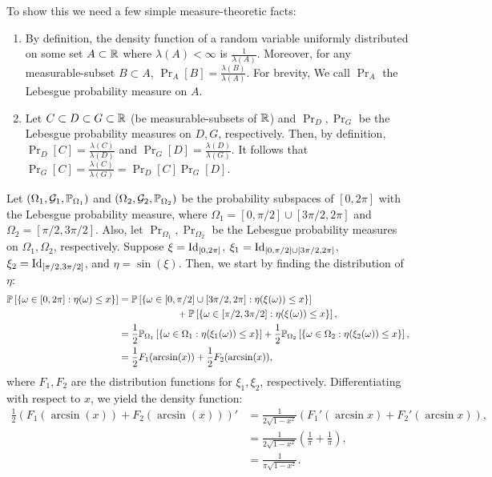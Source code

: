 \begin{problem}{11}
\end{problem}
\begin{solution}
    To show this we need a few simple measure-theoretic facts:
    \begin{enumerate}
        \item By definition, the density function of a random variable uniformly
        distributed on some set $A\subset \mathbb{R}$ where $\lambda(A) < \infty$ is
        $\frac{1}{\lambda(A)}$.  Moreover, for any measurable-subset $B\subset
        A$, $\Pr_A[B] = \frac{\lambda(B)}{\lambda(A)}$. For brevity, We call
        $\Pr_A$ the Lebesgue probability measure on $A$. 
        \item Let $C\subset D \subset G \subset \mathbb{R}$ (be measurable-subsets of
        $\mathbb{R}$) and $\Pr_D, \Pr_G$ be the Lebesgue probability measures on $D,G$,
        respectively. Then, by definition, $\Pr_D[C] =
        \frac{\lambda(C)}{\lambda(D)}$ and $\Pr_G[D] =
        \frac{\lambda(D)}{\lambda(G)}$. It follows that $\Pr_G[C] =
        \frac{\lambda(C)}{\lambda(G)} = \Pr_D[C]\Pr_G[D]$.
    \end{enumerate}
    Let $(\Omega_1, \mathcal{G}_1, \mathbb{P}_{\Omega_1})$ and $(\Omega_2, \mathcal{G}_2,
    \mathbb{P}_{\Omega_2})$ be the probability subspaces of $[0,2\pi]$ with the
    Lebesgue probability measure, where $\Omega_1 =[0,\pi/2] \cup [3\pi/2,2\pi]$
    and $\Omega_2 = [\pi/2,3\pi/2]$. Also, let $\Pr_{\Omega_1}, \Pr_{\Omega_2}$
    be the Lebesgue probability measures on $\Omega_1,\Omega_2$, respectively.
    Suppose $\xi = \operatorname{Id}_{[0,2\pi]}$, $\xi_1 = \operatorname{Id}_{[0,\pi/2] \cup
    [3\pi/2,2\pi]}$, $\xi_2 = \operatorname{Id}_{[\pi/2,3\pi/2]}$, and $\eta = \sin(\xi)$.
    Then, we start by finding the distribution of $\eta$:
    \begin{align*}
        \mathbb{P}\left[\left\{ \omega \in [0,2\pi]: \eta(\omega) \leq x \right\}\right] &= \mathbb{P}\left[\left\{ \omega \in [0,\pi/2]\cup [3\pi/2,2\pi]: \eta(\xi(\omega)) \leq x \right\}\right] \\
        &\qquad\qquad\qquad + \mathbb{P}\left[\left\{ \omega \in [\pi/2,3\pi/2]: \eta(\xi(\omega)) \leq x \right\}\right], \\
        &= \frac{1}{2}\mathbb{P}_{\Omega_1}\left[\left\{ \omega \in \Omega_1: \eta(\xi_1(\omega)) \leq x \right\}\right] + \frac{1}{2}\mathbb{P}_{\Omega_2}\left[\left\{ \omega \in \Omega_2: \eta(\xi_2(\omega)) \leq x \right\}\right], \\
        &= \frac{1}{2}F_1(\arcsin(x)) + \frac{1}{2}F_2(\arcsin(x)),
    \end{align*}
    where $F_1,F_2$ are the distribution functions for $\xi_1,\xi_2$, respectively. Differentiating with respect to $x$, we yield the density function:
    \begin{align*}
        \frac{1}{2}\left(F_1(\arcsin(x)) + F_2(\arcsin(x))\right)' &= \frac{1}{2\sqrt{1-x^2}}\left(F_1'(\arcsin x) + F_2'(\arcsin x)\right), \\
        &= \frac{1}{2\sqrt{1-x^2}}\left(\frac{1}{\pi} + \frac{1}{\pi}\right),\\
        &= \frac{1}{\pi\sqrt{1-x^2}}.
    \end{align*}
\end{solution}
